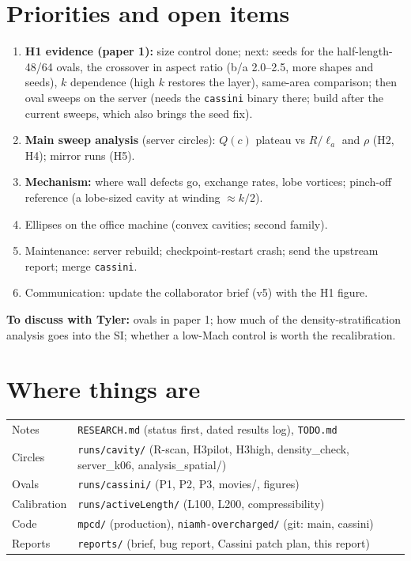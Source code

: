 \documentclass[11pt,a4paper]{article}
\newcommand{\la}{\ell_a}
\begin{document}
\section{Priorities and open items}
\begin{enumerate}
  \item \textbf{H1 evidence (paper 1):} size control done; next: seeds for the half-length-48/64 ovals, the crossover
        in aspect ratio (b/a 2.0--2.5, more shapes and seeds), $k$ dependence (high $k$ restores the layer), same-area comparison;
        then oval sweeps on the server (needs the \texttt{cassini} binary there; build after the current sweeps,
        which also brings the seed fix).
  \item \textbf{Main sweep analysis} (server circles): $Q(c)$ plateau vs $R/\la$ and $\rho$ (H2, H4); mirror runs (H5).
  \item \textbf{Mechanism:} where wall defects go, exchange rates, lobe vortices; pinch-off reference (a lobe-sized
        cavity at winding $\approx k/2$).
  \item Ellipses on the office machine (convex cavities; second family).
  \item Maintenance: server rebuild; checkpoint-restart crash; send the upstream report; merge \texttt{cassini}.
  \item Communication: update the collaborator brief (v5) with the H1 figure.
\end{enumerate}
\textbf{To discuss with Tyler:} ovals in paper 1; how much of the density-stratification analysis goes into the SI;
whether a low-Mach control is worth the recalibration.

\appendix
\section{Where things are}
\begin{tabularx}{\textwidth}{lX}\toprule
Notes & \texttt{RESEARCH.md} (status first, dated results log), \texttt{TODO.md}\\
Circles & \texttt{runs/cavity/} (R-scan, H3pilot, H3high, density\_check, server\_k06, analysis\_spatial/)\\
Ovals & \texttt{runs/cassini/} (P1, P2, P3, movies/, figures)\\
Calibration & \texttt{runs/activeLength/} (L100, L200, compressibility)\\
Code & \texttt{mpcd/} (production), \texttt{niamh-overcharged/} (git: main, cassini)\\
Reports & \texttt{reports/} (brief, bug report, Cassini patch plan, this report)\\\bottomrule
\end{tabularx}
\end{document}
